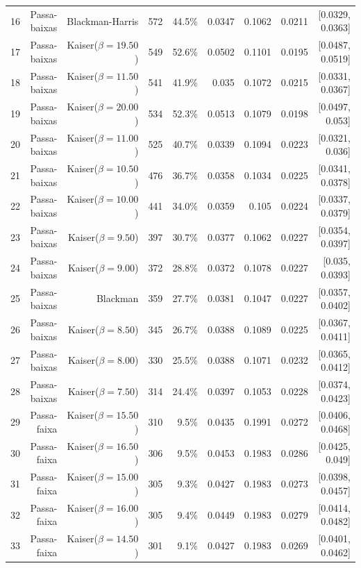 \begin{longtable}{lrrrrrrrr}
    16 & Passa-baixas & Blackman-Harris & 572 & 44.5\% & 0.0347 & 0.1062 & 0.0211 & [0.0329, 0.0363] \\
    17 & Passa-baixas & Kaiser($\beta=19.50$) & 549 & 52.6\% & 0.0502 & 0.1101 & 0.0195 & [0.0487, 0.0519] \\
    18 & Passa-baixas & Kaiser($\beta=11.50$) & 541 & 41.9\% & 0.035 & 0.1072 & 0.0215 & [0.0331, 0.0367] \\
    19 & Passa-baixas & Kaiser($\beta=20.00$) & 534 & 52.3\% & 0.0513 & 0.1079 & 0.0198 & [0.0497, 0.053] \\
    20 & Passa-baixas & Kaiser($\beta=11.00$) & 525 & 40.7\% & 0.0339 & 0.1094 & 0.0223 & [0.0321, 0.036] \\
    21 & Passa-baixas & Kaiser($\beta=10.50$) & 476 & 36.7\% & 0.0358 & 0.1034 & 0.0225 & [0.0341, 0.0378] \\
    22 & Passa-baixas & Kaiser($\beta=10.00$) & 441 & 34.0\% & 0.0359 & 0.105 & 0.0224 & [0.0337, 0.0379] \\
    23 & Passa-baixas & Kaiser($\beta=9.50$) & 397 & 30.7\% & 0.0377 & 0.1062 & 0.0227 & [0.0354, 0.0397] \\
    24 & Passa-baixas & Kaiser($\beta=9.00$) & 372 & 28.8\% & 0.0372 & 0.1078 & 0.0227 & [0.035, 0.0393] \\
    25 & Passa-baixas & Blackman & 359 & 27.7\% & 0.0381 & 0.1047 & 0.0227 & [0.0357, 0.0402] \\
    26 & Passa-baixas & Kaiser($\beta=8.50$) & 345 & 26.7\% & 0.0388 & 0.1089 & 0.0225 & [0.0367, 0.0411] \\
    27 & Passa-baixas & Kaiser($\beta=8.00$) & 330 & 25.5\% & 0.0388 & 0.1071 & 0.0232 & [0.0365, 0.0412] \\
    28 & Passa-baixas & Kaiser($\beta=7.50$) & 314 & 24.4\% & 0.0397 & 0.1053 & 0.0228 & [0.0374, 0.0423] \\
    29 & Passa-faixa & Kaiser($\beta=15.50$) & 310 & 9.5\% & 0.0435 & 0.1991 & 0.0272 & [0.0406, 0.0468] \\
    30 & Passa-faixa & Kaiser($\beta=16.50$) & 306 & 9.5\% & 0.0453 & 0.1983 & 0.0286 & [0.0425, 0.049] \\
    31 & Passa-faixa & Kaiser($\beta=15.00$) & 305 & 9.3\% & 0.0427 & 0.1983 & 0.0273 & [0.0398, 0.0457] \\
    32 & Passa-faixa & Kaiser($\beta=16.00$) & 305 & 9.4\% & 0.0449 & 0.1983 & 0.0279 & [0.0414, 0.0482] \\
    33 & Passa-faixa & Kaiser($\beta=14.50$) & 301 & 9.1\% & 0.0427 & 0.1983 & 0.0269 & [0.0401, 0.0462] \\

\end{longtable}
